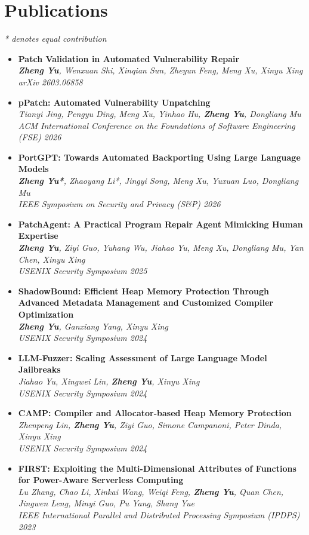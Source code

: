 \documentclass[letterpaper,11pt]{article}
\newcommand{\resumeItem}[1]{
  \item\small{
    {#1 \vspace{-2pt}}
  }
}
\newcommand{\resumeSubItem}[1]{\resumeItem{#1}}
\newcommand{\resumeSubHeadingListStart}{\begin{itemize}[leftmargin=0.15in, label={}]}
\newcommand{\resumeSubHeadingListEnd}{\end{itemize}}
\begin{document}
\section{Publications}
\small{\textit{* denotes equal contribution}}
\resumeSubHeadingListStart
\resumeSubItem{
    \textbf{Patch Validation in Automated Vulnerability Repair} \\
    \textit{\textbf{Zheng Yu}, Wenxuan Shi, Xinqian Sun, Zheyun Feng, Meng Xu, Xinyu Xing} \\
    \textit{arXiv 2603.06858} \\
  }
  \resumeSubItem{
    \textbf{pPatch: Automated Vulnerability Unpatching} \\
    \textit{Tianyi Jing, Pengyu Ding, Meng Xu, Yinhao Hu, \textbf{Zheng Yu}, Dongliang Mu} \\
    \textit{ACM International Conference on the Foundations of Software Engineering (FSE) 2026}
  }
  \resumeSubItem{
    \textbf{PortGPT: Towards Automated Backporting Using Large Language Models} \\
    \textit{\textbf{Zheng Yu*}, Zhaoyang Li*, Jingyi Song, Meng Xu, Yuxuan Luo, Dongliang Mu} \\
    \textit{IEEE Symposium on Security and Privacy (S\&P) 2026}
  }
  \resumeSubItem{
    \textbf{PatchAgent: A Practical Program Repair Agent Mimicking Human Expertise} \\
    \textit{\textbf{Zheng Yu}, Ziyi Guo, Yuhang Wu, Jiahao Yu, Meng Xu, Dongliang Mu, Yan Chen, Xinyu Xing} \\
    \textit{USENIX Security Symposium 2025}
  }
  \resumeSubItem{
    \textbf{ShadowBound: Efficient Heap Memory Protection Through Advanced Metadata Management and Customized Compiler Optimization} \\
    \textit{\textbf{Zheng Yu}, Ganxiang Yang, Xinyu Xing} \\
    \textit{USENIX Security Symposium 2024}
  }
  \resumeSubItem{
    \textbf{LLM-Fuzzer: Scaling Assessment of Large Language Model Jailbreaks} \\
    \textit{Jiahao Yu, Xingwei Lin, \textbf{Zheng Yu}, Xinyu Xing} \\
    \textit{USENIX Security Symposium 2024}
  }
  \resumeSubItem{
    \textbf{CAMP: Compiler and Allocator-based Heap Memory Protection} \\
    \textit{Zhenpeng Lin, \textbf{Zheng Yu}, Ziyi Guo, Simone Campanoni, Peter Dinda, Xinyu Xing} \\
    \textit{USENIX Security Symposium 2024}
  }
  \resumeSubItem{
    \textbf{FIRST: Exploiting the Multi-Dimensional Attributes of Functions for Power-Aware Serverless Computing} \\
    \textit{Lu Zhang, Chao Li, Xinkai Wang, Weiqi Feng, \textbf{Zheng Yu}, Quan Chen, Jingwen Leng, Minyi Guo, Pu Yang, Shang Yue} \\
    \textit{IEEE International Parallel and Distributed Processing Symposium (IPDPS) 2023}
  }
\resumeSubHeadingListEnd
\end{document}
